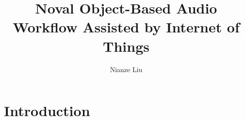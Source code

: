 \documentclass[jou]{apa6}
\title{Noval Object-Based Audio Workflow Assisted by Internet of Things}
\author{Nianze Liu}
\affiliation{New York University}
\begin{document}
\maketitle

\section{Introduction}

\printbibliography
\end{document}
